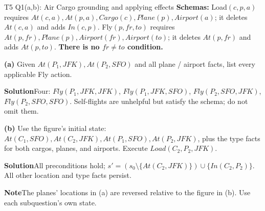 \documentclass[10pt,a4paper]{article}
\newcommand{\ans}{\par\smallskip\textbf{\color{good}Solution\quad}}
\newcommand{\pit}{\par\smallskip\textbf{\color{warn}Note\quad}}
\begin{document}
\begin{question}{T5 Q1(a,b): Air Cargo grounding and applying effects}\label{q:t5q1}
\textbf{Schemas:} Load$(c,p,a)$ requires $At(c,a),At(p,a),Cargo(c),Plane(p),Airport(a)$; it deletes $At(c,a)$ and adds $In(c,p)$. Fly$(p,fr,to)$ requires $At(p,fr),Plane(p),Airport(fr),Airport(to)$; it deletes $At(p,fr)$ and adds $At(p,to)$. \textbf{There is no $fr\ne to$ condition.}

\textbf{(a)} Given $At(P_1,JFK),At(P_2,SFO)$ and all plane / airport facts, list every applicable Fly action.
\ans Four: $Fly(P_1,JFK,JFK)$, $Fly(P_1,JFK,SFO)$, $Fly(P_2,SFO,JFK)$, $Fly(P_2,SFO,SFO)$. Self-flights are unhelpful but satisfy the schema; do not omit them.

\textbf{(b)} Use the figure's initial state: $At(C_1,SFO),At(C_2,JFK),At(P_1,SFO),At(P_2,JFK)$, plus the type facts for both cargos, planes, and airports. Execute $Load(C_2,P_2,JFK)$.
\ans All preconditions hold; $s'=(s_0\setminus\{At(C_2,JFK)\})\cup\{In(C_2,P_2)\}$. All other location and type facts persist.
\pit The planes' locations in (a) are reversed relative to the figure in (b). Use each subquestion's own state.
\end{question}
\end{document}
